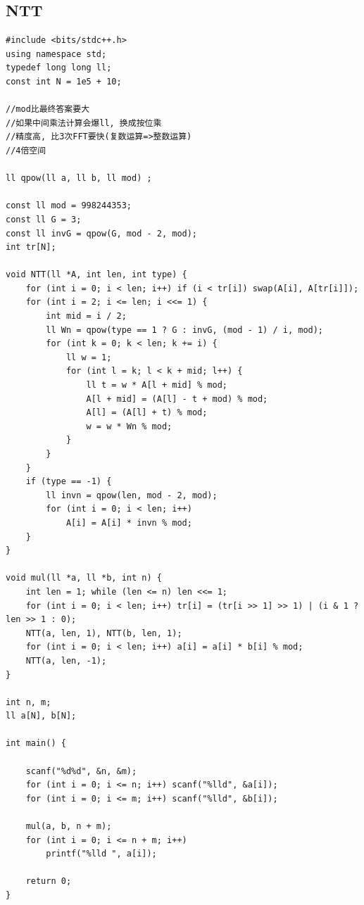 \documentclass[twoside]{article}
\begin{document}
\subsection{NTT}
\begin{lstlisting}
#include <bits/stdc++.h>
using namespace std;
typedef long long ll;
const int N = 1e5 + 10;

//mod比最终答案要大
//如果中间乘法计算会爆ll, 换成按位乘
//精度高, 比3次FFT要快(复数运算=>整数运算)
//4倍空间

ll qpow(ll a, ll b, ll mod) ;

const ll mod = 998244353;
const ll G = 3;
const ll invG = qpow(G, mod - 2, mod);
int tr[N];

void NTT(ll *A, int len, int type) {
    for (int i = 0; i < len; i++) if (i < tr[i]) swap(A[i], A[tr[i]]);
    for (int i = 2; i <= len; i <<= 1) {
        int mid = i / 2;
        ll Wn = qpow(type == 1 ? G : invG, (mod - 1) / i, mod);
        for (int k = 0; k < len; k += i) {
            ll w = 1;
            for (int l = k; l < k + mid; l++) {
                ll t = w * A[l + mid] % mod;
                A[l + mid] = (A[l] - t + mod) % mod;
                A[l] = (A[l] + t) % mod;
                w = w * Wn % mod;
            }
        }
    }
    if (type == -1) {
        ll invn = qpow(len, mod - 2, mod);
        for (int i = 0; i < len; i++)
            A[i] = A[i] * invn % mod;
    }
}

void mul(ll *a, ll *b, int n) {
    int len = 1; while (len <= n) len <<= 1;
    for (int i = 0; i < len; i++) tr[i] = (tr[i >> 1] >> 1) | (i & 1 ? len >> 1 : 0);
    NTT(a, len, 1), NTT(b, len, 1);
    for (int i = 0; i < len; i++) a[i] = a[i] * b[i] % mod;
    NTT(a, len, -1);
}

int n, m;
ll a[N], b[N];

int main() {

    scanf("%d%d", &n, &m);
    for (int i = 0; i <= n; i++) scanf("%lld", &a[i]);
    for (int i = 0; i <= m; i++) scanf("%lld", &b[i]);

    mul(a, b, n + m);
    for (int i = 0; i <= n + m; i++)
        printf("%lld ", a[i]);

    return 0;
}\end{lstlisting}
\end{document}
